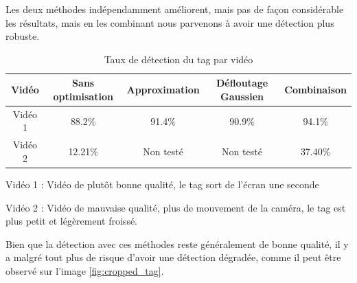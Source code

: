         Les deux méthodes indépendamment améliorent, mais pas de façon considérable les résultats, mais en les combinant nous parvenons à avoir une détection plus robuste.

        \begin{table}[!h]
            \begin{center}
                \begin{tabular}{ | c | c | c | c | c | }
                \hline
                Vidéo & Sans optimisation & Approximation & Défloutage Gaussien & Combinaison \\ \hline
                Vidéo 1 & 88.2\% & 91.4\% & 90.9\% & 94.1\% \\ \hline
                Vidéo 2 & 12.21\% & Non testé & Non testé & 37.40\% \\
                \hline
                \end{tabular}
        \end{center}
        \caption{Taux de détection du tag par vidéo}
        \end{table}

        Vidéo 1 : Vidéo de plutôt bonne qualité, le tag sort de l'écran une seconde

        Vidéo 2 : Vidéo de mauvaise qualité, plus de mouvement de la caméra, le tag est plus petit et légèrement froissé.

        Bien que la détection avec ces méthodes reste généralement de bonne qualité, il y a malgré tout plus de risque d'avoir une détection dégradée, comme il peut être observé sur l'image \ref{fig:cropped_tag}.

